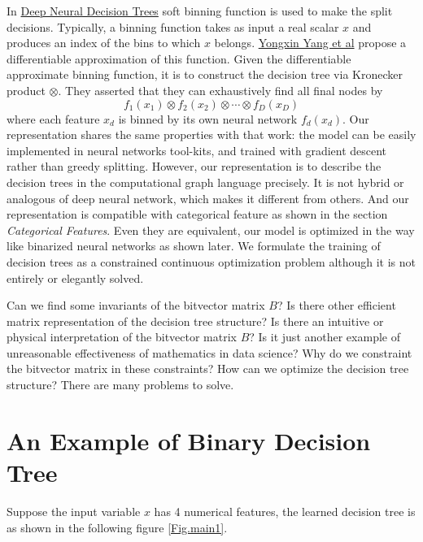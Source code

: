 \documentclass[UTF8]{article}
\begin{document}
In \href{https://arxiv.org/abs/1806.06988}{Deep Neural Decision Trees}
soft binning function is used to make the split decisions.
Typically, a binning function takes as input a real scalar $x$
and produces an index of the bins to which $x$ belongs.
\href{https://arxiv.org/abs/1806.06988}{Yongxin Yang et al} propose a differentiable approximation of this function.
Given the differentiable approximate binning function,
it is to construct the decision tree via Kronecker product $\otimes$.
They asserted  that they can exhaustively find all final nodes by
$$f_1(x_1)\otimes f_2(x_2)\otimes\cdots\otimes f_D(x_D)$$
where each feature $x_d$ is binned  by its own neural network $f_d(x_d)$.
Our representation shares the same properties with that work:
the model can be easily implemented in neural networks tool-kits,
and trained with gradient descent rather than greedy splitting.
However, our representation is to describe the decision trees in the computational graph language precisely.
It is not hybrid or analogous of deep neural network,
which makes it different from others.
And our representation is  compatible with categorical feature
as shown in the section \emph{Categorical Features}.
Even they are equivalent,
our model is optimized in the way like binarized neural networks as shown later.
We formulate the  training of decision trees
as a constrained continuous optimization problem
although it is not entirely or elegantly solved.


Can we find some invariants of the bitvector matrix $B$?
Is there other efficient matrix representation of the decision tree structure?
Is there an intuitive or physical interpretation of the bitvector matrix $B$?
Is it just another example of unreasonable effectiveness of mathematics in data science?
Why do we constraint the bitvector matrix in these constraints?
How can we optimize the decision tree structure?
There are many problems to solve.


\section{An Example of Binary Decision Tree}

Suppose the input variable $x$ has 4 numerical features,
the learned decision tree is as shown in the following figure \ref{Fig.main1}.
\end{document}
